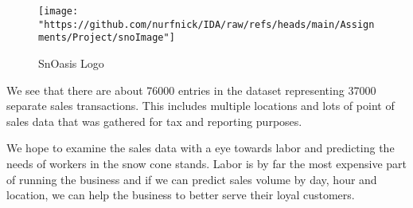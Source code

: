 \documentclass[
]{article}
\begin{document}
\begin{figure}
\centering
\texttt{[image: "https://github.com/nurfnick/IDA/raw/refs/heads/main/Assignments/Project/snoImage"]}
\caption{SnOasis Logo}
\end{figure}

We see that there are about 76000 entries in the dataset representing
37000 separate sales transactions. This includes multiple locations and
lots of point of sales data that was gathered for tax and reporting
purposes.

We hope to examine the sales data with a eye towards labor and
predicting the needs of workers in the snow cone stands. Labor is by far
the most expensive part of running the business and if we can predict
sales volume by day, hour and location, we can help the business to
better serve their loyal customers.
\end{document}
